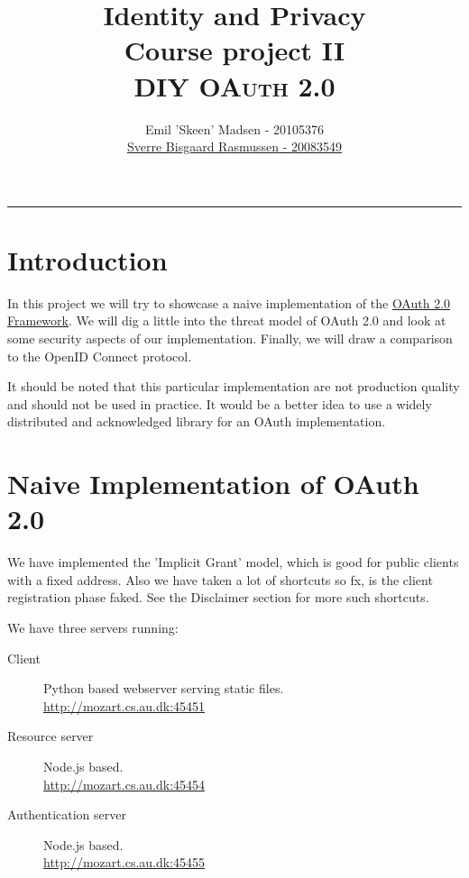 \documentclass[12pt, a4paper]{article}
\begin{document}
\title{
\small Identity and Privacy \\
Course project II \\
\huge \textsc{DIY OAuth 2.0}
}

\author{Emil 'Skeen' Madsen - 20105376 \\
\href{mailto:sverre@cs.au.dk}{Sverre Bisgaard Rasmussen - 20083549}
}

\date{}

\maketitle

\hrule

\section*{Introduction}

  In this project we will try to showcase a naive implementation of
  the
  \href{http://tools.ietf.org/html/rfc6749}{OAuth 2.0 Framework}.
  We will dig a little into the threat model of OAuth 2.0 and look at
  some security aspects of our implementation.
  Finally, we will draw a comparison to the OpenID Connect protocol.

  It should be noted that this particular implementation are not
  production quality and should not be
  used in practice.
  It would be a better idea to use a widely distributed and acknowledged
  library for an OAuth implementation.

\section*{Naive Implementation of OAuth 2.0}

  We have implemented the 'Implicit Grant' model, which is good for
  public clients with a fixed address.
  Also we have taken a lot of shortcuts so fx, is the client registration
  phase faked.
  See the Disclaimer section for more such shortcuts.

  We have three servers running:
  \begin{description}
    \item[Client] Python based webserver
      serving static files. \\
      \url{http://mozart.cs.au.dk:45451}
    \item[Resource server]
      Node.js based. \\
      \url{http://mozart.cs.au.dk:45454}
    \item[Authentication
      server]
      Node.js based. \\
      \url{http://mozart.cs.au.dk:45455}
  \end{description}
\end{document}
